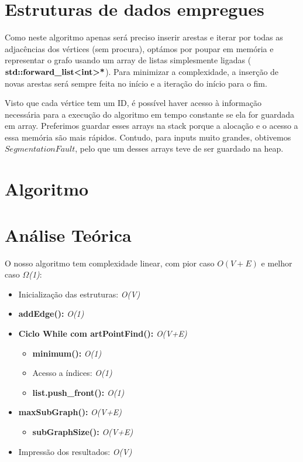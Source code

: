 \documentclass[12pt]{article}
\begin{document}
{\section{Estruturas de dados empregues}
    \par
    Como neste algoritmo apenas será preciso inserir arestas e iterar por todas as 
    adjacências dos vértices (sem procura), optámos por poupar em memória e representar o 
    grafo usando um array de listas simplesmente ligadas ($\textbf{std::forward\_list\textless int\textgreater*}$). 
    Para minimizar a complexidade, a inserção de novas arestas será sempre feita no início e a 
    iteração do início para o fim.
    \par
    Visto que cada vértice tem um ID, é possível haver acesso à informação necessária para a 
    execução do algoritmo em tempo constante se ela for guardada em array. Preferimos guardar 
    esses arrays na stack porque a alocação e o acesso a essa memória são mais rápidos. 
    Contudo, para inputs muito grandes, obtivemos $Segmentation Fault$, pelo que um desses 
    arrays teve de ser guardado na heap.
    
\section{Algoritmo}
\section{Análise Teórica} 
    O nosso algoritmo tem complexidade linear, com pior caso \textit{$O(V+E)$} 
    e melhor caso \textit{$\Omega$(1)}:
    \begin{itemize}
        \item Inicialização das estruturas: \textit{O(V)}
        \item \textbf{addEdge():} \textit{O(1)}
        \item \textbf{Ciclo While com artPointFind():} \textit{O(V+E)}
        \begin{itemize}
            \item \textbf{minimum():} \textit{O(1)}
            \item Acesso a índices: \textit{O(1)}
            \item \textbf{list.push\_front():} \textit{O(1)}
        \end{itemize}
        \item \textbf{maxSubGraph():} \textit{O(V+E)}
        \begin{itemize}
            \item \textbf{subGraphSize():} \textit{O(V+E)}
        \end{itemize}
        \item Impressão dos resultados: \textit{O(V)}
    \end{itemize}


}
\end{document}
